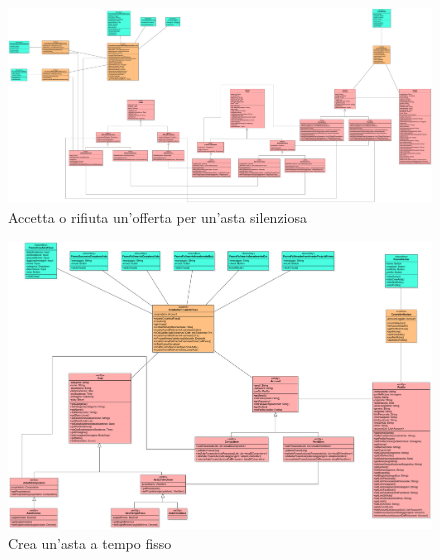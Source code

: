         \begin{figure}[htbp!]
            \centering
                \includegraphics[width=1\linewidth]{Immagini/Diagrammi/Class Diagram/Analisi/Venditore e compratore/AccettaRifiutaOffertaSilenziosa.pdf}
            \caption{Accetta o rifiuta un'offerta per un'asta silenziosa}
        \end{figure}
        
        \begin{figure}[htbp!]
            \centering
                \includegraphics[width=1\linewidth]{Immagini/Diagrammi/Class Diagram/Analisi/Venditore e compratore/CreaAstaFissa.pdf}
            \caption{Crea un'asta a tempo fisso}
        \end{figure}
        
